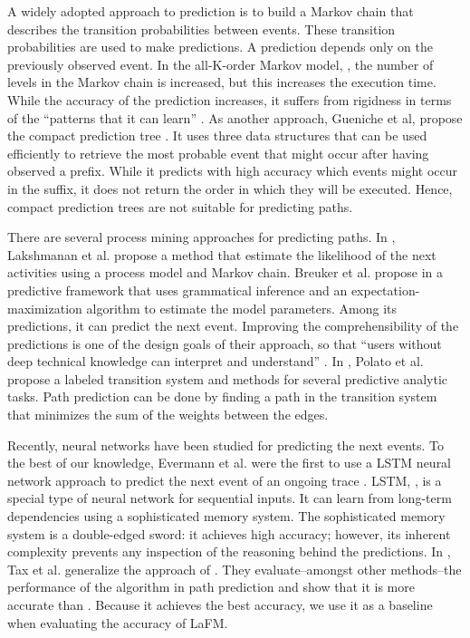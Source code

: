 \documentclass[runningheads]{llncs}
\begin{document}
A widely adopted approach to prediction is to build a Markov chain that describes the transition probabilities between events. These transition probabilities are used to make predictions. A prediction depends only on the previously observed event. In the all-K-order Markov model, \cite{pitkow1999mininglongestrepeatin}, the number of levels in the Markov chain is increased, but this increases the execution time. While the accuracy of the prediction increases, it suffers from rigidness in terms of the ``patterns that it can learn'' \cite{gueniche2013cpt}. As another approach, Gueniche et al, propose the compact prediction tree \cite{gueniche2013cpt}. It uses three data structures that can be used efficiently to retrieve the most probable event that might occur after having observed a prefix. While it predicts with high accuracy which events might occur in the suffix, it does not return the order in which they will be executed. Hence, compact prediction trees are not suitable for predicting paths.

There are several process mining approaches for predicting paths. In \cite{lakshmanan2015markov}, Lakshmanan et al. propose a method that estimate the likelihood of the next activities using a process model and Markov chain. Breuker et al. propose in \cite{breuker2016comprehensible} a predictive framework that uses grammatical inference and an expectation-maximization algorithm to estimate the model parameters. Among its predictions, it can predict the next event. Improving the comprehensibility of the predictions is one of the design goals of their approach, so that ``users without deep technical knowledge can interpret and understand'' \cite{breuker2016comprehensible}. In \cite{polato2018time}, Polato et al. propose a labeled transition system and methods for several predictive analytic tasks. Path prediction can be done by finding a path in the transition system that minimizes the sum of the weights between the edges.

Recently, neural networks have been studied for predicting the next events. To the best of our knowledge, Evermann et al. were the first to use a LSTM neural network approach to predict the next event of an ongoing trace \cite{evermann2016deep}. LSTM, \cite{hochreiter1997long}, is a special type of neural network for sequential inputs. It can learn from long-term dependencies using a sophisticated memory system. The sophisticated memory system is a double-edged sword: it achieves high accuracy; however, its inherent complexity prevents any inspection of the reasoning behind the predictions. In \cite{tax2017predictive}, Tax et al. generalize the approach of \cite{evermann2016deep}. They evaluate--amongst other methods--the performance of the algorithm in path prediction and show that it is more accurate than \cite{evermann2016deep,breuker2016comprehensible,polato2018time}. Because it achieves the best accuracy, we use it as a baseline when evaluating the accuracy of LaFM.
\end{document}
